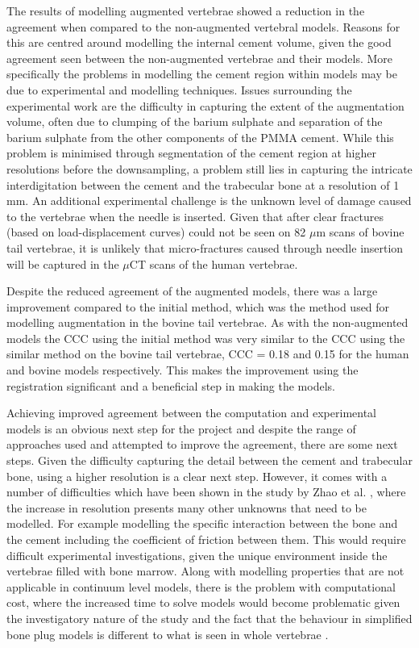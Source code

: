 The results of modelling augmented vertebrae showed a reduction in the
agreement when compared to the non-augmented vertebral models.  Reasons for
this are centred around modelling the internal cement volume, given the good
agreement seen between the non-augmented vertebrae and their models.  More
specifically the problems in modelling the cement region within models may be
due to experimental and modelling techniques.  Issues surrounding the
experimental work are the difficulty in capturing the extent of the
augmentation volume, often due to clumping of the barium sulphate and
separation of the barium sulphate from the other components of the PMMA cement.
While this problem is minimised through segmentation of the cement region at
higher resolutions before the downsampling, a problem still lies in capturing
the intricate interdigitation between the cement and the trabecular bone at a
resolution of 1 mm.  An additional experimental challenge is the unknown level
of damage caused to the vertebrae when the needle is inserted.  Given that
after clear fractures (based on load-displacement curves) could not be seen on
82 $\mu$m scans of bovine tail vertebrae, it is unlikely that micro-fractures
caused through needle insertion will be captured in the $\mu$CT scans of the
human vertebrae.

Despite the reduced agreement of the augmented models, there was a large
improvement compared to the initial method, which was the method used for
modelling augmentation in the bovine tail vertebrae.  As with the non-augmented
models the CCC using the initial method was very similar to the CCC using the
similar method on the bovine tail vertebrae, CCC = 0.18 and 0.15 for the human
and bovine models respectively.  This makes the improvement using the
registration significant and a beneficial step in making the models.

Achieving improved agreement between the computation and experimental models is
an obvious next step for the project and despite the range of approaches used
and attempted to improve the agreement, there are some next steps.  Given the
difficulty capturing the detail between the cement and trabecular bone, using a
higher resolution is a clear next step.  However, it comes with a number of
difficulties which have been shown in the study by Zhao et al. \cite{Zhao2012},
where the increase in resolution presents many other unknowns that need to be
modelled.  For example modelling the specific interaction between the bone and
the cement including the  coefficient of friction between them.  This would
require difficult experimental investigations, given the unique environment
inside the vertebrae filled with bone marrow.  Along with modelling properties
that are not applicable in continuum level models, there is the problem with
computational cost, where the increased time to solve models would become
problematic given the investigatory nature of the study and the fact that the
behaviour in simplified bone plug models is different to what is seen in whole
vertebrae \cite{Sikora2013}.

